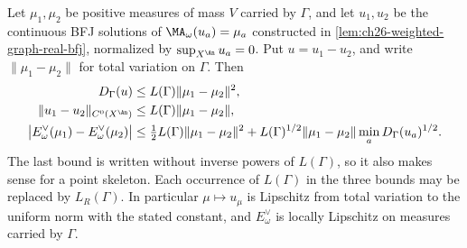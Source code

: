 \begin{theorem}
\label{thm:ch28-curve-stability}
Let \(\mu_1,\mu_2\) be positive measures of mass \(V\) carried by
\(\Gamma\), and let \(u_1,u_2\) be the continuous BFJ solutions of
\(\MA_\omega(u_a)=\mu_a\) constructed in
\cref{lem:ch26-weighted-graph-real-bfj}, normalized by
\(\sup_{X^{\An}}u_a=0\).  Put \(u=u_1-u_2\), and write
\(\lVert\mu_1-\mu_2\rVert\) for total variation on \(\Gamma\).  Then
\begin{align}
\label{eq:ch28-curve-stability-dirichlet}
 D_\Gamma(u)&\leq L(\Gamma)\lVert\mu_1-\mu_2\rVert^2,\\
\label{eq:ch28-curve-stability-sup}
 \lVert u_1-u_2\rVert_{C^0(X^{\An})}
   &\leq L(\Gamma)\lVert\mu_1-\mu_2\rVert,\\
\label{eq:ch28-curve-stability-dual}
 \bigl|E^\vee_\omega(\mu_1)-E^\vee_\omega(\mu_2)\bigr|
   &\leq\tfrac12L(\Gamma)\lVert\mu_1-\mu_2\rVert^2
      +L(\Gamma)^{1/2}\lVert\mu_1-\mu_2\rVert
          \min_a D_\Gamma(u_a)^{1/2}.
\end{align}
The last bound is written without inverse powers of \(L(\Gamma)\),
so it also makes sense for a point skeleton.
Each occurrence of \(L(\Gamma)\) in the three bounds may be replaced
by \(L_R(\Gamma)\).  In particular \(\mu\mapsto u_\mu\) is Lipschitz
from total variation to the uniform norm with the stated constant, and
\(E^\vee_\omega\) is locally Lipschitz on measures carried by \(\Gamma\).
\end{theorem}


